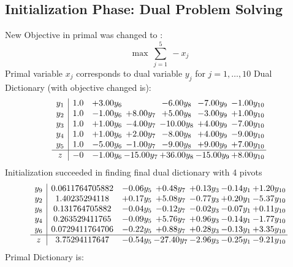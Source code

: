 \documentclass[9pt]{article}
\begin{document}
\subsection{Initialization Phase: Dual Problem Solving}
New Objective in primal was changed to : \[ \max\ \sum_{j=1}^{5}\ - x_j \] 
Primal variable $x_j$ corresponds to dual variable $y_j$ for $j = 1,\ldots,10$
Dual Dictionary (with objective changed is): 
\[\begin{array}{c| c c@{\hskip 2pt} c@{\hskip 2pt} c@{\hskip 2pt} c@{\hskip 2pt} c@{\hskip 2pt} }
 y_{1}   &  1.0 & +  3.00 y_{6} &   & -6.00 y_{8} & -7.00 y_{9} & -1.00 y_{10}\\
 y_{2}   &  1.0 & -1.00 y_{6} & +  8.00 y_{7} & +  5.00 y_{8} & -3.00 y_{9} & +  1.00 y_{10}\\
 y_{3}   &  1.0 & +  1.00 y_{6} & -4.00 y_{7} & -10.00 y_{8} & +  4.00 y_{9} & -7.00 y_{10}\\
 y_{4}   &  1.0 & +  1.00 y_{6} & +  2.00 y_{7} & -8.00 y_{8} & +  4.00 y_{9} & -9.00 y_{10}\\
 y_{5}   &  1.0 & -5.00 y_{6} & -1.00 y_{7} & -9.00 y_{8} & +  9.00 y_{9} & +  7.00 y_{10}\\
\hline
z    &  -0 & -1.00 y_{6} & -15.00 y_{7} & + 36.00 y_{8} & -15.00 y_{9} & +  8.00 y_{10}\\
\end{array}\]
Initialization succeeded in finding final dual dictionary with 4 pivots
\[\begin{array}{c| c c@{\hskip 2pt} c@{\hskip 2pt} c@{\hskip 2pt} c@{\hskip 2pt} c@{\hskip 2pt} }
 y_{9}   &  0.0611764705882 & -0.06 y_{5} & +  0.48 y_{7} & +  0.13 y_{3} & -0.14 y_{1} & +  1.20 y_{10}\\
 y_{2}   &  1.40235294118 & +  0.17 y_{5} & +  5.08 y_{7} & -0.77 y_{3} & +  0.20 y_{1} & -5.37 y_{10}\\
 y_{8}   &  0.131764705882 & -0.04 y_{5} & -0.12 y_{7} & -0.02 y_{3} & -0.07 y_{1} & +  0.11 y_{10}\\
 y_{4}   &  0.263529411765 & -0.09 y_{5} & +  5.76 y_{7} & +  0.96 y_{3} & -0.14 y_{1} & -1.77 y_{10}\\
 y_{6}   &  0.0729411764706 & -0.22 y_{5} & +  0.88 y_{7} & +  0.28 y_{3} & -0.13 y_{1} & +  3.35 y_{10}\\
\hline
z    &  3.75294117647 & -0.54 y_{5} & -27.40 y_{7} & -2.96 y_{3} & -0.25 y_{1} & -9.21 y_{10}\\
\end{array}\]
Primal Dictionary is:
\end{document}
